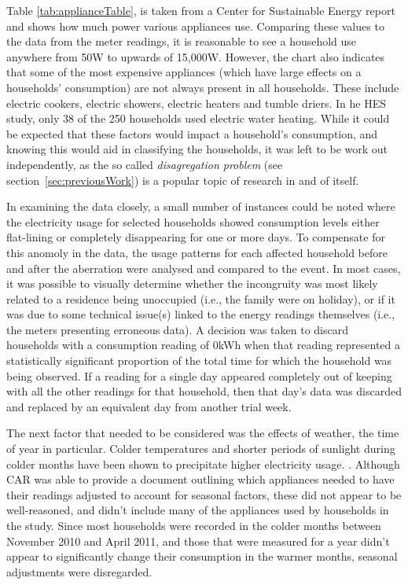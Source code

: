 Table \ref{tab:applianceTable}, is taken from a Center for Sustainable Energy \cite{CSE} report and shows how much power various appliances use. Comparing these values to the data from the meter readings, it is reasonable to see a household use anywhere from 50W to upwards of 15,000W. However, the chart also indicates that some of the most expensive appliances (which have large effects on a households' consumption) are not always present in all households. These include electric cookers, electric showers, electric heaters and tumble driers. In he HES study, only 38 of the 250 households used electric water heating. While it could be expected that these factors would impact a household's consumption, and knowing this would aid in classifying the households, it was left to be work out independently, as the so called \textit{disagregation problem} (see section~\ref{sec:previousWork}) is a popular topic of research in and of itself.

\applianceTable


In examining the data closely, a small number of instances could be noted where the electricity usage for selected households showed consumption levels either flat-lining or completely disappearing for one or more days.  To compensate for this anomoly in the data, the usage patterns for each affected household before and after the aberration were analysed and compared to the event.  In most cases, it was possible to visually determine whether the incongruity was most likely related to a residence being unoccupied (i.e., the family were on holiday), or if it was due to some technical issue(s) linked to the energy readings themselves (i.e., the meters presenting erroneous data).  A decision was taken to discard households with a consumption reading of 0kWh when that reading represented a statistically significant proportion of the total time for which the household was being observed.  If a reading for a single day appeared completely out of keeping with all the other readings for that household, then that day's data was discarded and replaced by an equivalent day from another trial week.

The next factor that needed to be considered was the effects of weather, the time of year in particular. Colder temperatures and shorter periods of sunlight during colder months have been shown to precipitate higher electricity usage.  \cite{DECC}. Although CAR was able to provide a document outlining which appliances needed to have their readings adjusted to account for seasonal factors, these did not appear to be well-reasoned, and didn't include many of the appliances used by households in the study. Since most households were recorded in the colder months between November 2010 and April 2011, and those that were measured for a year didn't appear to significantly change their consumption in the warmer months, seasonal adjustments were disregarded.

